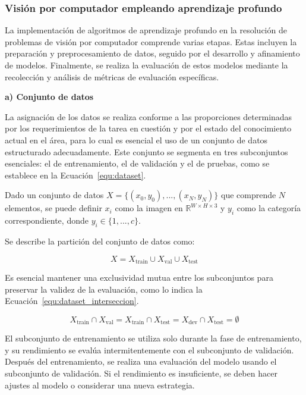 \subsubsection{Visión por computador empleando aprendizaje profundo}

La implementación de algoritmos de aprendizaje profundo en la resolución de problemas de visión por computador comprende varias etapas. Estas incluyen la preparación y preprocesamiento de datos, seguido por el desarrollo y afinamiento de modelos. Finalmente, se realiza la evaluación de estos modelos mediante la recolección y análisis de métricas de evaluación específicas.

\textbf{a) Conjunto de datos}

La asignación de los datos se realiza conforme a las proporciones determinadas por los requerimientos de la tarea en cuestión y por el estado del conocimiento actual en el área, para lo cual es esencial el uso de un conjunto de datos estructurado adecuadamente. Este conjunto se segmenta en tres subconjuntos esenciales: el de entrenamiento, el de validación y el de pruebas, como se establece en la Ecuación~\ref{equ:dataset}.

Dado un conjunto de datos \( X = \{(x_{0},y_{0}), ..., (x_{N},y_{N})\} \) que comprende \( N \) elementos, se puede definir \( x_{i} \) como la imagen en \( \mathbb{R}^{W \times H \times 3} \) y \( y_{i} \) como la categoría correspondiente, donde \( y_{i} \in \{1, ..., c\} \).

Se describe la partición del conjunto de datos como:

\begin{equation}
    \label{equ:dataset}
    X = X_{\text{train}} \cup X_{\text{val}} \cup X_{\text{test}}
\end{equation}

Es esencial mantener una exclusividad mutua entre los subconjuntos para preservar la validez de la evaluación, como lo indica la Ecuación~\ref{equ:dataset_interseccion}.

\begin{equation}
    \label{equ:dataset_interseccion}
    X_{\text{train}} \cap X_{\text{val}} = X_{\text{train}} \cap X_{\text{test}} = X_{\text{dev}} \cap X_{\text{test}} = \emptyset
\end{equation}

El subconjunto de entrenamiento se utiliza solo durante la fase de entrenamiento, y su rendimiento se evalúa intermitentemente con el subconjunto de validación. Después del entrenamiento, se realiza una evaluación del modelo usando el subconjunto de validación. Si el rendimiento es insuficiente, se deben hacer ajustes al modelo o considerar una nueva estrategia.

